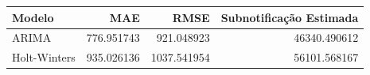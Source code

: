 \begin{tabular}{lrrr}
\toprule
Modelo & MAE & RMSE & Subnotificação Estimada \\
\midrule
ARIMA & 776.951743 & 921.048923 & 46340.490612 \\
Holt-Winters & 935.026136 & 1037.541954 & 56101.568167 \\
\bottomrule
\end{tabular}
